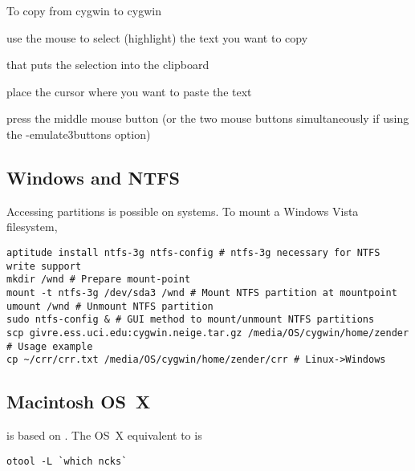 \documentclass[12pt,twoside]{article}
\begin{document}
To copy from cygwin to cygwin
\begin{enumerate*}
\item use the mouse to select (highlight) the text you want to copy
\item that puts the selection into the clipboard
\item place the cursor where you want to paste the text
\item press the middle mouse button (or the two mouse buttons simultaneously if using the -emulate3buttons option)
\end{enumerate*}

\subsection{Windows and NTFS}
Accessing  partitions is possible on
 systems.
To mount a Windows Vista  filesystem,
\begin{verbatim}
aptitude install ntfs-3g ntfs-config # ntfs-3g necessary for NTFS write support
mkdir /wnd # Prepare mount-point
mount -t ntfs-3g /dev/sda3 /wnd # Mount NTFS partition at mountpoint
umount /wnd # Unmount NTFS partition
sudo ntfs-config & # GUI method to mount/unmount NTFS partitions
scp givre.ess.uci.edu:cygwin.neige.tar.gz /media/OS/cygwin/home/zender # Usage example
cp ~/crr/crr.txt /media/OS/cygwin/home/zender/crr # Linux->Windows
\end{verbatim}

\subsection{Macintosh OS~X}
 is based on .
The OS~X equivalent to  is 
\begin{verbatim}
otool -L `which ncks`
\end{verbatim}
\end{document}

